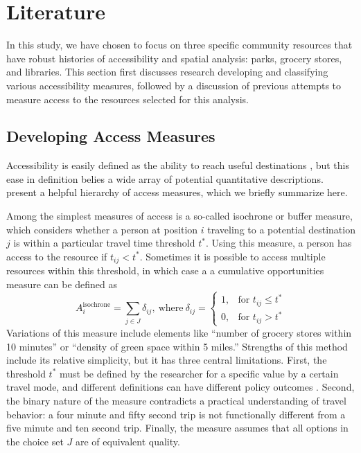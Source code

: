 \documentclass[3p, authoryear, review]{elsarticle} %
\begin{document}
\hypertarget{lit-review}{%
\section{Literature}\label{lit-review}}

In this study, we have chosen to focus on three specific community resources
that have robust histories of accessibility and spatial analysis: parks, grocery
stores, and libraries. This section first discusses research developing and
classifying various accessibility measures, followed by a discussion of previous
attempts to measure access to the resources selected for this analysis.

\hypertarget{developing-access-measures}{%
\subsection{Developing Access Measures}\label{developing-access-measures}}

Accessibility is easily defined as the ability to reach useful destinations \citep{handy1997},
but this ease in definition belies a wide array of potential quantitative
descriptions. \citet{dong2006} present a helpful hierarchy of access measures, which we
briefly summarize here.

Among the simplest measures of access is a so-called isochrone or buffer measure, which
considers whether a person at position \(i\) traveling to a potential destination
\(j\) is within a particular travel time threshold \(t^*\). Using this measure, a
person has access to the resource if \(t_{ij} < t^*\). Sometimes it is
possible to access multiple resources within this threshold, in which case a
a cumulative opportunities measure can be defined as
\begin{equation}
  A_i^{\mathrm{isochrone}} = \sum_{j \in J} \delta_{ij}, 
  \mathrm{\ where\ } \delta_{ij} = 
  \begin{cases}
    1, & \text{for } t_{ij} \leq t^*\\
    0, & \text{for } t_{ij} > t^*
  \end{cases} 
  \label{eq:isochrone}
\end{equation}
Variations of this measure include elements like ``number of grocery stores
within 10 minutes'' or ``density of green space within 5 miles.'' Strengths of
this method include its relative simplicity, but it has three central limitations. First,
the threshold \(t^*\) must be defined by the researcher for a specific value by
a certain travel mode, and different definitions
can have different policy outcomes \citep{logan2019}. Second, the binary nature of the
measure contradicts a practical understanding of travel behavior: a four minute and fifty second
trip is not functionally different from a five minute and ten second trip. Finally,
the measure assumes that all options in the choice set \(J\) are of equivalent
quality.
\end{document}
